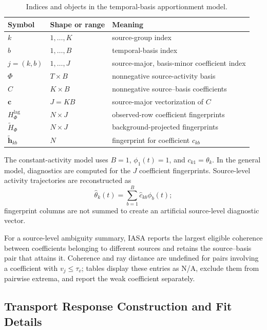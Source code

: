 \begin{table}[h]
\centering
\small
\caption{Indices and objects in the temporal-basis apportionment model.}
\label{tab:temporal_basis_notation}
\begin{tabularx}{\columnwidth}{llX}
\toprule
Symbol & Shape or range & Meaning \\
\midrule
\(k\) & \(1,\ldots,K\) & source-group index \\
\(b\) & \(1,\ldots,B\) & temporal-basis index \\
\(j=(k,b)\) & \(1,\ldots,J\) & source-major, basis-minor coefficient index \\
\(\Phi\) & \(T\times B\) & nonnegative source-activity basis \\
\(C\) & \(K\times B\) & nonnegative source--basis coefficients \\
\(\mathbf c\) & \(J=KB\) & source-major vectorization of \(C\) \\
\(H_\Phi^{\mathrm{lag}}\) & \(N\times J\) & observed-row coefficient fingerprints \\
\(\widetilde H_\Phi\) & \(N\times J\) & background-projected fingerprints \\
\(\widetilde{\mathbf h}_{kb}\) & \(N\) & fingerprint for coefficient \(c_{kb}\) \\
\bottomrule
\end{tabularx}
\end{table}

The constant-activity model uses \(B=1\), \(\phi_1(t)=1\), and
\(c_{k1}=\theta_k\).  In the general model, diagnostics are computed for the
\(J\) coefficient fingerprints.  Source-level activity trajectories are
reconstructed as
\[
\widehat\theta_k(t)=\sum_{b=1}^{B}\widehat c_{kb}\phi_b(t);
\]
fingerprint columns are not summed to create an artificial source-level
diagnostic vector.

For a source-level ambiguity summary, IASA reports the largest eligible
coherence between coefficients belonging to different sources and retains the
source--basis pair that attains it.  Coherence and ray distance are undefined
for pairs involving a coefficient with \(v_j\le\tau_v\); tables display these
entries as N/A, exclude them from pairwise extrema, and report the weak
coefficient separately.


\subsection{Transport Response Construction and Fit Details}
\label{app:transport_response}

